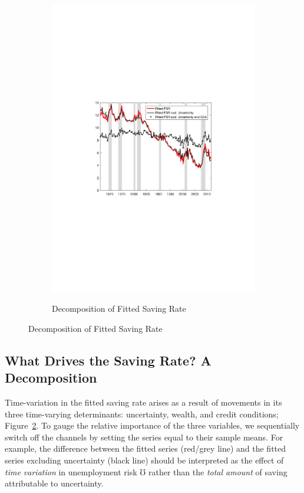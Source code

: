 \documentclass[titlepage]{\econtex}
\begin{document}
\begin{figure}
\begin{subfigure}[t]{0.49\textheight}
		{\includegraphics[width=0.475\textheight]{./Figures/fPSR_StructDecomp}}
		\caption{Decomposition of Fitted Saving Rate}\label{fPSR_StructDecomp}
	\end{subfigure}
\end{figure}


\subsection{What Drives the Saving Rate? A Decomposition}

Time-variation in the fitted saving rate arises as a result of movements in its three time-varying determinants: uncertainty, wealth, and credit conditions; Figure~\ref{fPSR_StructDecomp}. To gauge the relative importance of the three variables, we sequentially switch off the channels by setting the series equal to their sample means. For example, the difference between the fitted series  (red/grey line) and the fitted series excluding uncertainty (black line) should be interpreted as the effect of \emph{time variation} in unemployment risk $\mho$ rather than the \emph{total amount} of saving attributable to uncertainty.
\end{document}
